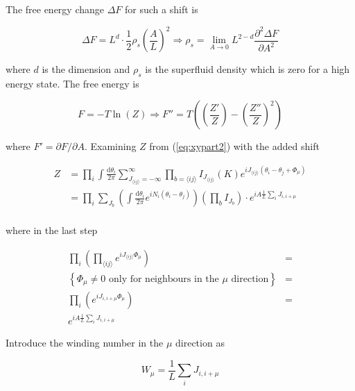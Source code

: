 The free energy change $\Delta F$ for such a shift is

\begin{equation}
    \Delta F = L^d \cdot \frac{1}{2} \rho_s \left( \frac{A}{L} \right)^2 \Rightarrow \rho_s = \lim_{A \to 0} L^{2 - d}\frac{\partial^2 \Delta F}{\partial A^2}
\end{equation}

where $d$ is the dimension and $\rho_s$ is the superfluid density which is zero for a high energy state. The free energy is

\begin{equation}
F = - T \ln(Z) \Rightarrow F'' = T \left(\left(\frac{Z'}{Z}\right) - \left( \frac{Z''}{Z} \right)^2 \right)
\label{eq:xyfreeenergy}
\end{equation}

where $F' = \partial F / \partial A$. Examining $Z$ from (\ref{eq:xypart2}) with the added shift

\begin{align}
    Z &= \prod_i \int \frac{\mathrm d \theta_i}{2 \pi} \sum_{J_{\langle ij \rangle} = -\infty}^{\infty} \prod_{b = \langle ij \rangle} I_{J_{\langle ij \rangle}} ( K ) e^{i J_{\langle ij \rangle} (\theta_i - \theta_j + \Phi_\mu)} \\
%
    & = \prod_i \sum_{J_b} \left ( \int \frac{\mathrm d \theta_i}{2 \pi} e^{i N_i (\theta_i - \theta_j)} \right ) \left ( \prod_b I_{J_b} \right ) \cdot e^{i A \frac{1}{L} \sum_i J_{i, i+\mu}} \\
\label{eq:xypart3}
\end{align}

where in the last step

\begin{align}
    \prod_i \left (\prod_{\langle ij \rangle} e^{i J_{\langle ij \rangle} \Phi_\mu} \right) &= \\
%
    \left\{ \text{$\Phi_\mu \neq 0$ only for neighbours in the $\mu$ direction} \right \} &= \\
%
    \prod_i \left ( e^{iJ_{i, i+\mu} \Phi_\mu} \right ) &= \\
%
    e^{iA \frac{1}{L} \sum_i J_{i, i+\mu}}
\end{align}

Introduce the winding number in the $\mu$ direction as

\begin{equation}
    W_\mu = \frac{1}{L} \sum_i J_{i, i+\mu}
\label{eq:defwinding}
\end{equation}

